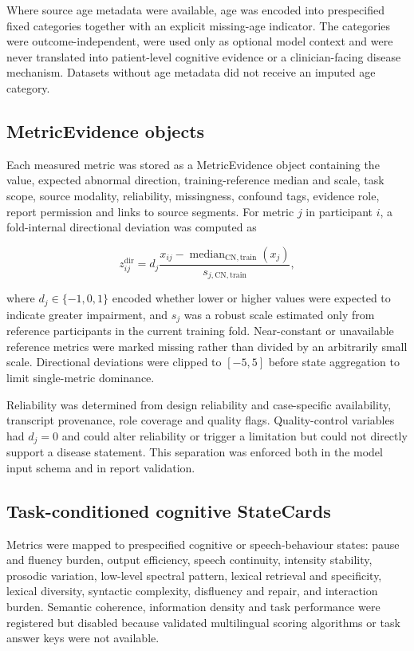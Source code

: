 \documentclass[pdflatex,sn-nature]{sn-jnl}
\begin{document}
Where source age metadata were available, age was encoded into prespecified fixed categories together with an explicit missing-age indicator. The categories were outcome-independent, were used only as optional model context and were never translated into patient-level cognitive evidence or a clinician-facing disease mechanism. Datasets without age metadata did not receive an imputed age category.

\subsection{MetricEvidence objects}

Each measured metric was stored as a MetricEvidence object containing the value, expected abnormal direction, training-reference median and scale, task scope, source modality, reliability, missingness, confound tags, evidence role, report permission and links to source segments. For metric $j$ in participant $i$, a fold-internal directional deviation was computed as

\begin{equation}
z_{ij}^{\mathrm{dir}} = d_j\frac{x_{ij}-\operatorname{median}_{\mathrm{CN,train}}(x_j)}{s_{j,\mathrm{CN,train}}},
\end{equation}

where $d_j\in\{-1,0,1\}$ encoded whether lower or higher values were expected to indicate greater impairment, and $s_j$ was a robust scale estimated only from reference participants in the current training fold. Near-constant or unavailable reference metrics were marked missing rather than divided by an arbitrarily small scale. Directional deviations were clipped to $[-5,5]$ before state aggregation to limit single-metric dominance.

Reliability was determined from design reliability and case-specific availability, transcript provenance, role coverage and quality flags. Quality-control variables had $d_j=0$ and could alter reliability or trigger a limitation but could not directly support a disease statement. This separation was enforced both in the model input schema and in report validation.

\subsection{Task-conditioned cognitive StateCards}

Metrics were mapped to prespecified cognitive or speech-behaviour states: pause and fluency burden, output efficiency, speech continuity, intensity stability, prosodic variation, low-level spectral pattern, lexical retrieval and specificity, lexical diversity, syntactic complexity, disfluency and repair, and interaction burden. Semantic coherence, information density and task performance were registered but disabled because validated multilingual scoring algorithms or task answer keys were not available.
\end{document}
